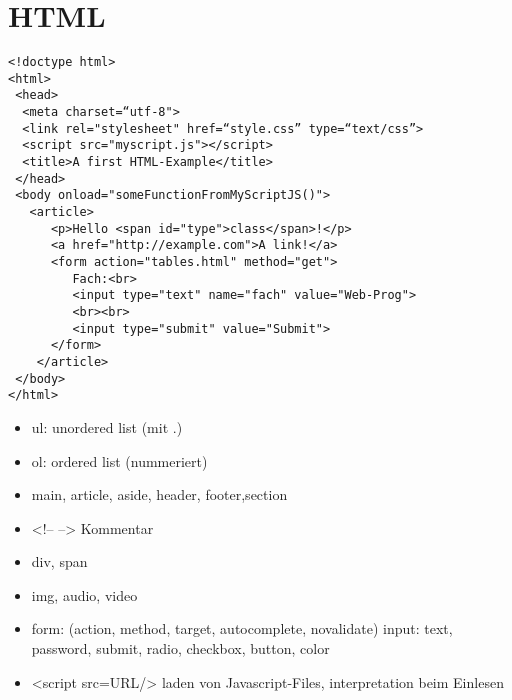 \section{HTML}
\begin{verbatim}
<!doctype html>
<html>
 <head>
  <meta charset=“utf-8">
  <link rel="stylesheet" href=“style.css” type=“text/css”>
  <script src="myscript.js"></script>
  <title>A first HTML-Example</title>
 </head>
 <body onload="someFunctionFromMyScriptJS()">
   <article>
      <p>Hello <span id="type">class</span>!</p>
      <a href="http://example.com">A link!</a>
      <form action="tables.html" method="get">
         Fach:<br>
         <input type="text" name="fach" value="Web-Prog">
         <br><br>
         <input type="submit" value="Submit">
      </form>
    </article>
 </body>
</html>
\end{verbatim}

\begin{itemize}
\item ul: unordered list (mit .)
\item ol: ordered list (nummeriert)
\item main, article, aside, header, footer,section
\item <!-- --> Kommentar
\item div, span
\item img, audio, video
\item form: (action, method, target, autocomplete, novalidate)
   input: text, password, submit, radio, checkbox, button, color
  \item <script src=URL/> laden von Javascript-Files, interpretation beim Einlesen
\end{itemize}



